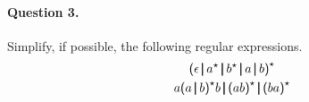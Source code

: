 \paragraph{Question 3.} Simplify, if possible, the following regular
expressions.
\begin{gather*}
  \textsf{(} \epsilon \, \pmb{\lvert}{} \, a^{\star}{} \, \pmb{\lvert}{} \,
  b^{\star}{} \, \pmb{\lvert}{} \, a \, \pmb{\lvert}{} \, b \textsf{)}^{\star}\\
  a \textsf{(} a \, \pmb{\lvert}{} \, b \textsf{)}^{\star}{} b 
  \, \pmb{\lvert}{} \, \textsf{(} a b \textsf{)}^{\star}{} 
  \, \pmb{\lvert}{} \, \textsf{(} b a \textsf{)}^{\star}
\end{gather*}
